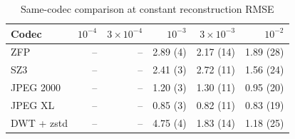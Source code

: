 \begin{table}[t]
\centering
\caption{Same-codec comparison at constant reconstruction RMSE}
\label{tab:fixed_codec}
\footnotesize
\setlength{\tabcolsep}{3pt}
\begin{tabular}{lrrrrr}
\toprule
Codec & $10^{-4}$ & $3\times10^{-4}$ & $10^{-3}$ & $3\times10^{-3}$ & $10^{-2}$ \\
\midrule
ZFP & -- & -- & 2.89 (4) & 2.17 (14) & 1.89 (28) \\
SZ3 & -- & -- & 2.41 (3) & 2.72 (11) & 1.56 (24) \\
JPEG 2000 & -- & -- & 1.20 (3) & 1.30 (11) & 0.95 (20) \\
JPEG XL & -- & -- & 0.85 (3) & 0.82 (11) & 0.83 (19) \\
DWT + zstd & -- & -- & 4.75 (4) & 1.83 (14) & 1.18 (25) \\
\bottomrule
\end{tabular}
\end{table}
